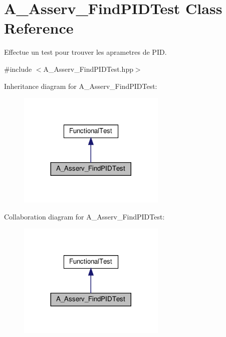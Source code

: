 \hypertarget{classA__Asserv__FindPIDTest}{}\section{A\+\_\+\+Asserv\+\_\+\+Find\+P\+I\+D\+Test Class Reference}
\label{classA__Asserv__FindPIDTest}


Effectue un test pour trouver les aprametres de P\+ID.  




{\ttfamily \#include $<$A\+\_\+\+Asserv\+\_\+\+Find\+P\+I\+D\+Test.\+hpp$>$}



Inheritance diagram for A\+\_\+\+Asserv\+\_\+\+Find\+P\+I\+D\+Test\+:
\nopagebreak
\begin{figure}[H]
\begin{center}
\leavevmode
\includegraphics[width=200pt]{classA__Asserv__FindPIDTest__inherit__graph}
\end{center}
\end{figure}


Collaboration diagram for A\+\_\+\+Asserv\+\_\+\+Find\+P\+I\+D\+Test\+:
\nopagebreak
\begin{figure}[H]
\begin{center}
\leavevmode
\includegraphics[width=200pt]{classA__Asserv__FindPIDTest__coll__graph}
\end{center}
\end{figure}
